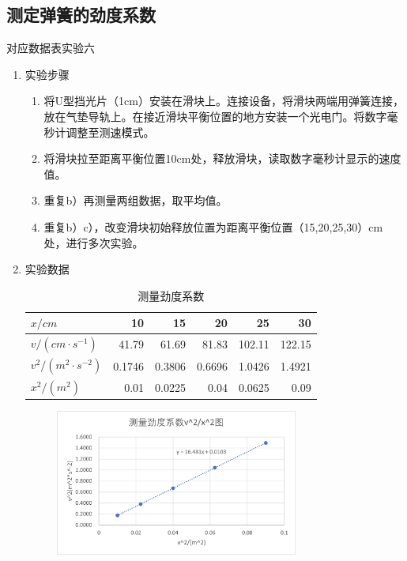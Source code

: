\documentclass[11pt]{article}
\begin{document}
\subsection{测定弹簧的劲度系数}
对应数据表实验六
\begin{enumerate}
    \item 实验步骤
    \begin{enumerate}
        \item 将U型挡光片（1cm）安装在滑块上。连接设备，将滑块两端用弹簧连接，放在气垫导轨上。在接近滑块平衡位置的地方安装一个光电门。将数字毫秒计调整至测速模式。
        \item 将滑块拉至距离平衡位置10cm处，释放滑块，读取数字毫秒计显示的速度值。
        \item 重复b）再测量两组数据，取平均值。
        \item 重复b）c），改变滑块初始释放位置为距离平衡位置（15,20,25,30）cm处，进行多次实验。
    \end{enumerate}
    \item 实验数据
        \begin{table}[H]
          \centering
          \caption{测量劲度系数}
            \begin{tabular}{|l|r|r|r|r|r|}\hline 
            $x/cm$    & 10     & 15     & 20     & 25     & 30 \\\hline
            $v/(cm \cdot s^{-1})$     & 41.79  & 61.69  & 81.83  & 102.11 & 122.15 \\\hline
            $v^{2}/(m^{2} \cdot s^{-2})$ & 0.1746 & 0.3806 & 0.6696 & 1.0426 & 1.4921 \\\hline
            $x^{2}/(m^{2})$     & 0.01   & 0.0225 & 0.04   & 0.0625 & 0.09 \\\hline
            \end{tabular}%
          \label{tab:测量劲度系数}%
        \end{table}%
        \begin{figure}[H]
            \begin{minipage}[t]{0.49\linewidth}
                \centering
                \includegraphics[width=8cm]{Fig/测量劲度系数.png}

\end{minipage}
\end{figure}
\end{enumerate}
\end{document}
